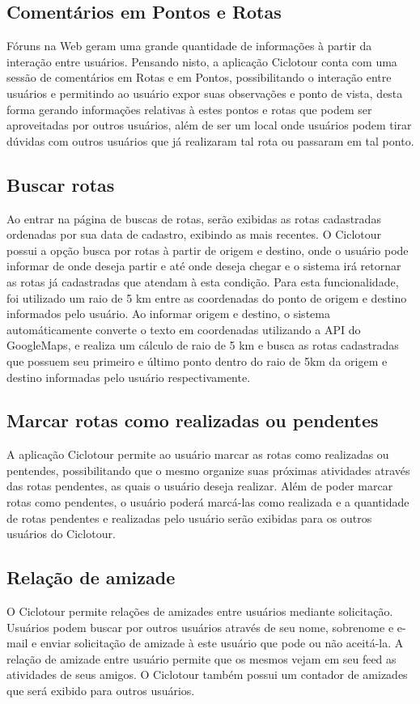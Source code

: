 \subsection{Comentários em Pontos e Rotas}
Fóruns na Web geram uma grande quantidade de informações à partir da interação entre usuários. Pensando nisto, a aplicação Ciclotour conta com uma 
sessão de comentários em Rotas e em Pontos, possibilitando o interação entre usuários e permitindo ao usuário expor suas observações e ponto de 
vista, desta forma gerando informações relativas à estes pontos e rotas que podem ser aproveitadas por outros usuários, além de ser um local onde 
usuários podem tirar dúvidas com outros usuários que já realizaram tal rota ou passaram em tal ponto.

\subsection{Buscar rotas}
Ao entrar na página de buscas de rotas, serão exibidas as rotas cadastradas ordenadas por sua data de cadastro, exibindo as mais recentes.
O Ciclotour possui a opção busca por rotas à partir de origem e destino, onde o usuário pode informar de onde deseja partir e até onde deseja chegar
e o sistema irá retornar as rotas já cadastradas que atendam à esta condição. Para esta funcionalidade, foi utilizado um raio de 5 km entre as 
coordenadas do ponto de origem e destino informados pelo usuário. Ao informar origem e destino, o sistema automáticamente converte o texto em 
coordenadas utilizando a API do GoogleMaps, e realiza um cálculo de raio de 5 km e busca as rotas cadastradas que possuem seu primeiro e último ponto
dentro do raio de 5km da origem e destino informadas pelo usuário respectivamente.

\subsection{Marcar rotas como realizadas ou pendentes}
A aplicação Ciclotour permite ao usuário marcar as rotas como realizadas ou pentendes, possibilitando que o mesmo organize suas próximas atividades
através das rotas pendentes, as quais o usuário deseja realizar. Além de poder marcar rotas como pendentes, o usuário poderá marcá-las como realizada
e a quantidade de rotas pendentes e realizadas pelo usuário serão exibidas para os outros usuários do Ciclotour.

\subsection{Relação de amizade}
O Ciclotour permite relações de amizades entre usuários mediante solicitação. Usuários podem buscar por outros usuários através de seu nome, 
sobrenome e e-mail e enviar solicitação de amizade à este usuário que pode ou não aceitá-la. A relação de amizade entre usuário permite que os mesmos
vejam em seu feed as atividades de seus amigos. O Ciclotour também possui um contador de amizades que será exibido para outros usuários.


